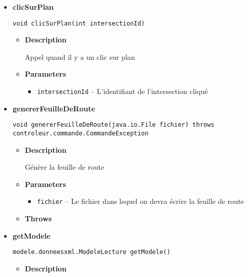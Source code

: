 \documentclass[11pt,a4paper]{report}
\begin{document}
{{{{\begin{itemize}
{\begin{itemize}
{Appel quand il y a un clic sur une livraison
}
\item{
{\bf  Parameters}
  \begin{itemize}
   \item{
\texttt{livraisonId} -- L'identifiant de la livraison}
  \end{itemize}
}%
\end{itemize}
}%
\item{ 
\hypertarget{controleur.ControleurInterface.clicSurPlan(int)}{{\bf  clicSurPlan}\\}
\begin{lstlisting}[frame=none]
void clicSurPlan(int intersectionId)\end{lstlisting} %
\begin{itemize}
\item{
{\bf  Description}

Appel quand il y a un clic sur plan
}
\item{
{\bf  Parameters}
  \begin{itemize}
   \item{
\texttt{intersectionId} -- L'identifiant de l'intersection cliqué}
  \end{itemize}
}%
\end{itemize}
}%
\item{ 
\hypertarget{controleur.ControleurInterface.genererFeuilleDeRoute(java.io.File)}{{\bf  genererFeuilleDeRoute}\\}
\begin{lstlisting}[frame=none]
void genererFeuilleDeRoute(java.io.File fichier) throws controleur.commande.CommandeException\end{lstlisting} %
\begin{itemize}
\item{
{\bf  Description}

Génère la feuille de route
}
\item{
{\bf  Parameters}
  \begin{itemize}
   \item{
\texttt{fichier} -- Le fichier dans lequel on devra écrire la feuille de route}
  \end{itemize}
}%
\item{{\bf  Throws}
}%
\end{itemize}
}%
\item{ 
\hypertarget{controleur.ControleurInterface.getModele()}{{\bf  getModele}\\}
\begin{lstlisting}[frame=none]
modele.donneesxml.ModeleLecture getModele()\end{lstlisting} %
\begin{itemize}
\item{
{\bf  Description}

}
\end{itemize}}
\end{itemize}}}}}
\end{document}
